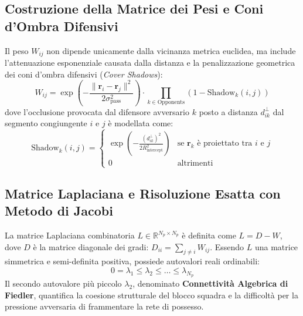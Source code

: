 \documentclass[11pt,a4paper]{article}
\begin{document}
\subsection{Costruzione della Matrice dei Pesi e Coni d'Ombra Difensivi}
Il peso $W_{ij}$ non dipende unicamente dalla vicinanza metrica euclidea, ma include l'attenuazione esponenziale causata dalla distanza e la penalizzazione geometrica dei coni d'ombra difensivi (\textsl{Cover Shadows}):
\begin{equation}
W_{ij} = \exp\left( -\frac{\|\mathbf{r}_i - \mathbf{r}_j\|^2}{2 \sigma_{\text{pass}}^2} \right) \cdot \prod_{k \in \text{Opponents}} (1 - \text{Shadow}_{k}(i, j))
\end{equation}
dove l'occlusione provocata dal difensore avversario $k$ posto a distanza $d_{ik}^{\perp}$ dal segmento congiungente $i$ e $j$ è modellata come:
\begin{equation}
\text{Shadow}_{k}(i, j) = \begin{cases}
\exp\left( -\frac{(d_{ik}^{\perp})^2}{2 R_{\text{intercept}}^2} \right) & \text{se } \mathbf{r}_k \text{ è proiettato tra } i \text{ e } j \\
0 & \text{altrimenti}
\end{cases}
\end{equation}

\subsection{Matrice Laplaciana e Risoluzione Esatta con Metodo di Jacobi}
La matrice Laplaciana combinatoria $L \in \mathbb{R}^{N_p \times N_p}$ è definita come $L = D - W$, dove $D$ è la matrice diagonale dei gradi: $D_{ii} = \sum_{j \ne i} W_{ij}$.
Essendo $L$ una matrice simmetrica e semi-definita positiva, possiede autovalori reali ordinabili:
\begin{equation}
0 = \lambda_1 \le \lambda_2 \le \dots \le \lambda_{N_p}
\end{equation}
Il secondo autovalore più piccolo $\lambda_2$, denominato \textbf{Connettività Algebrica di Fiedler}, quantifica la coesione strutturale del blocco squadra e la difficoltà per la pressione avversaria di frammentare la rete di possesso.
\end{document}
